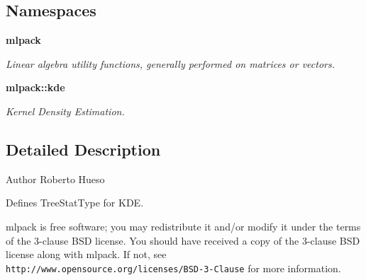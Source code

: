 \subsection*{Namespaces}
\begin{DoxyCompactItemize}
\item 
 \textbf{ mlpack}
\begin{DoxyCompactList}\small\item\em Linear algebra utility functions, generally performed on matrices or vectors. \end{DoxyCompactList}\item 
 \textbf{ mlpack\+::kde}
\begin{DoxyCompactList}\small\item\em Kernel Density Estimation. \end{DoxyCompactList}\end{DoxyCompactItemize}


\subsection{Detailed Description}
\begin{DoxyAuthor}{Author}
Roberto Hueso
\end{DoxyAuthor}
Defines Tree\+Stat\+Type for K\+DE.

mlpack is free software; you may redistribute it and/or modify it under the terms of the 3-\/clause B\+SD license. You should have received a copy of the 3-\/clause B\+SD license along with mlpack. If not, see {\tt http\+://www.\+opensource.\+org/licenses/\+B\+S\+D-\/3-\/\+Clause} for more information. 
